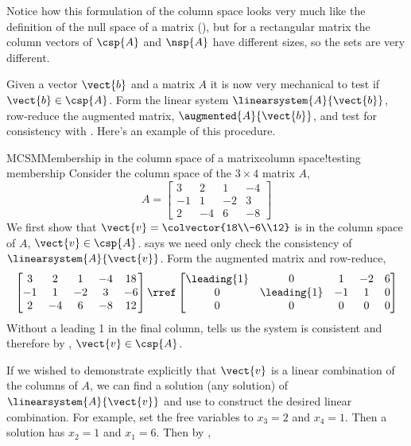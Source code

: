 %
Notice how this formulation of the column space looks very much like the definition of the null space of a matrix (), but for a rectangular matrix the column vectors of $\csp{A}$ and $\nsp{A}$ have different sizes, so the sets are very different.\par
%
Given a vector $\vect{b}$ and a matrix $A$ it is now very mechanical to test if $\vect{b}\in\csp{A}$.  Form the linear system $\linearsystem{A}{\vect{b}}$, row-reduce the augmented matrix, $\augmented{A}{\vect{b}}$, and test for consistency with .  Here's an example of this procedure.
%
%
\begin{example}{MCSM}{Membership in the column space of a matrix}{column space!testing membership}
Consider the column space of the $3\times 4$ matrix $A$,
%
\begin{equation*}
A=
\begin{bmatrix}
3 & 2 & 1 & -4\\
-1 & 1 & -2 & 3\\
2 & -4 & 6 & -8
\end{bmatrix}
\end{equation*}
%
We first show that $\vect{v}=\colvector{18\\-6\\12}$ is in the column space of $A$, $\vect{v}\in\csp{A}$.   says we need only check the consistency of $\linearsystem{A}{\vect{v}}$.  Form the augmented matrix and row-reduce,
%
\begin{equation*}
\begin{bmatrix}
3 & 2 & 1 & -4 & 18\\
-1 & 1 & -2 & 3 & -6\\
2 & -4 & 6 & -8 & 12
\end{bmatrix}
%
\rref
%
\begin{bmatrix}
\leading{1} & 0 & 1 & -2 & 6\\
0 & \leading{1} & -1 & 1 & 0\\
0 & 0 & 0 & 0 & 0
\end{bmatrix}
\end{equation*}
%
Without a leading 1 in the final column,  tells us the system is consistent and therefore by , $\vect{v}\in\csp{A}$.\par
%
If we wished to demonstrate explicitly that $\vect{v}$ is a linear combination of the columns of $A$, we can find a solution (any solution) of $\linearsystem{A}{\vect{v}}$ and use  to construct the desired linear combination.  For example, set the free variables to $x_3=2$ and $x_4=1$.  Then a solution has $x_2=1$ and $x_1=6$.  Then by ,

\end{example}
